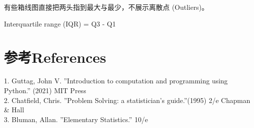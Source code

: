 有些箱线图直接把两头指到最大与最少，不展示离散点 (Outliers)。

Interquartile range (IQR) = Q3 - Q1

\hypertarget{ux53c2ux8003references}{%
\section{参考References}\label{ux53c2ux8003references}}

1. Guttag, John V. ''Introduction to computation and programming using Python.'' (2021) MIT Press \\
2. Chatfield, Chris.  ''Problem Solving: a statistician's guide.''(1995) 2/e Chapman \& Hall \\
3. Bluman, Allan. ''Elementary Statistics.'' 10/e\\


